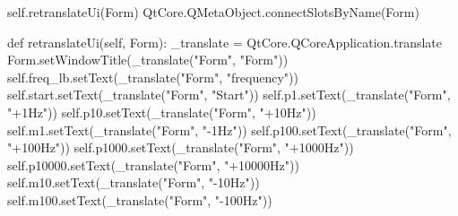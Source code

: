 \documentclass{article}
\begin{document}
\begin{appendices}
\begin{python}
            self.retranslateUi(Form)
            QtCore.QMetaObject.connectSlotsByName(Form)

        def retranslateUi(self, Form):
            _translate = QtCore.QCoreApplication.translate
            Form.setWindowTitle(_translate("Form", "Form"))
            self.freq_lb.setText(_translate("Form", "frequency"))
            self.start.setText(_translate("Form", "Start"))
            self.p1.setText(_translate("Form", "+1Hz"))
            self.p10.setText(_translate("Form", "+10Hz"))
            self.m1.setText(_translate("Form", "-1Hz"))
            self.p100.setText(_translate("Form", "+100Hz"))
            self.p1000.setText(_translate("Form", "+1000Hz"))
            self.p10000.setText(_translate("Form", "+10000Hz"))
            self.m10.setText(_translate("Form", "-10Hz"))
            self.m100.setText(_translate("Form", "-100Hz"))
    \end{python}
\end{appendices}
\end{document}
